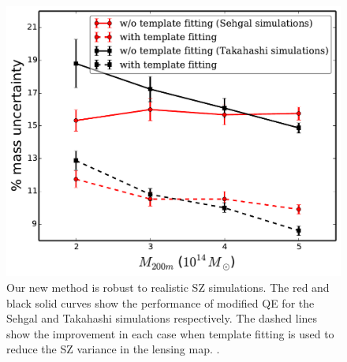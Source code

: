 {\begin{figure}[htb]
\includegraphics[width=\linewidth]{figs/Daisuke_Sehgal_results.pdf}
 \caption{
Our new method is robust to realistic SZ simulations. 
The red and black solid curves show the performance of modified QE for the Sehgal and Takahashi simulations respectively. 
The dashed lines show the improvement in each case when template fitting is used to reduce the SZ variance in the lensing map. 
 .
 }
\label{fig:realistic_sims}
\end{figure}

}
